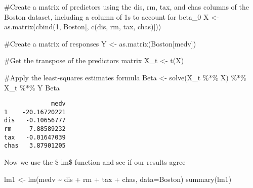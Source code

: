 \documentclass[
  letterpaper,
  DIV=11,
  numbers=noendperiod]{scrartcl}
\newenvironment{Shaded}{\begin{snugshade}}{\end{snugshade}}
\newcommand{\AttributeTok}[1]{\textcolor[rgb]{0.40,0.45,0.13}{#1}}
\newcommand{\CommentTok}[1]{\textcolor[rgb]{0.37,0.37,0.37}{#1}}
\newcommand{\DecValTok}[1]{\textcolor[rgb]{0.68,0.00,0.00}{#1}}
\newcommand{\FunctionTok}[1]{\textcolor[rgb]{0.28,0.35,0.67}{#1}}
\newcommand{\NormalTok}[1]{\textcolor[rgb]{0.00,0.23,0.31}{#1}}
\newcommand{\OtherTok}[1]{\textcolor[rgb]{0.00,0.23,0.31}{#1}}
\newcommand{\SpecialCharTok}[1]{\textcolor[rgb]{0.37,0.37,0.37}{#1}}
\newcommand{\StringTok}[1]{\textcolor[rgb]{0.13,0.47,0.30}{#1}}
\begin{document}
\begin{Shaded}
\begin{Highlighting}[]
\CommentTok{\#Create a matrix of predictors using the dis, rm, tax, and chas columns of the Boston dataset, including a column of 1s to account for beta\_0}
\NormalTok{X }\OtherTok{\textless{}{-}} \FunctionTok{as.matrix}\NormalTok{(}\FunctionTok{cbind}\NormalTok{(}\DecValTok{1}\NormalTok{, Boston[, }\FunctionTok{c}\NormalTok{(}\StringTok{\textquotesingle{}dis\textquotesingle{}}\NormalTok{, }\StringTok{\textquotesingle{}rm\textquotesingle{}}\NormalTok{, }\StringTok{\textquotesingle{}tax\textquotesingle{}}\NormalTok{, }\StringTok{\textquotesingle{}chas\textquotesingle{}}\NormalTok{)]))}

\CommentTok{\#Create a matrix of responses}
\NormalTok{Y }\OtherTok{\textless{}{-}} \FunctionTok{as.matrix}\NormalTok{(Boston[}\StringTok{\textquotesingle{}medv\textquotesingle{}}\NormalTok{])}

\CommentTok{\#Get the transpose of the predictors matrix}
\NormalTok{X\_t }\OtherTok{\textless{}{-}} \FunctionTok{t}\NormalTok{(X)}

\CommentTok{\#Apply the least{-}squares estimates formula}
\NormalTok{Beta }\OtherTok{\textless{}{-}} \FunctionTok{solve}\NormalTok{(X\_t }\SpecialCharTok{\%*\%}\NormalTok{ X) }\SpecialCharTok{\%*\%}\NormalTok{ X\_t }\SpecialCharTok{\%*\%}\NormalTok{ Y}
\NormalTok{Beta}
\end{Highlighting}
\end{Shaded}

\begin{verbatim}
             medv
1    -20.16720221
dis   -0.10656777
rm     7.88589232
tax   -0.01647039
chas   3.87901205
\end{verbatim}

Now we use the \$ lm\$ function and see if our results agree

\begin{Shaded}
\begin{Highlighting}[]
\NormalTok{lm1 }\OtherTok{\textless{}{-}} \FunctionTok{lm}\NormalTok{(medv }\SpecialCharTok{\textasciitilde{}}\NormalTok{ dis }\SpecialCharTok{+}\NormalTok{ rm }\SpecialCharTok{+}\NormalTok{ tax }\SpecialCharTok{+}\NormalTok{ chas, }\AttributeTok{data=}\NormalTok{Boston)}
\FunctionTok{summary}\NormalTok{(lm1)}
\end{Highlighting}
\end{Shaded}
\end{document}
